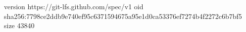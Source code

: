 version https://git-lfs.github.com/spec/v1
oid sha256:7798ce2ddb9e740ef95c6371594675a95e1d0ca53376ef7274b4f2272c6b7bf5
size 43840
